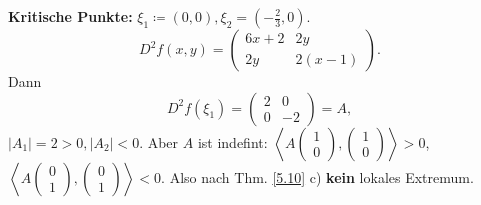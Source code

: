 \textbf{Kritische Punkte:} $ \xi_1 \coloneqq (0, 0), \xi_2 = \left( - \frac{ 2 }{ 3 } , 0 \right)  $.
\[
	D^2 f (x, y) = \begin{pmatrix} 6x + 2 & 2y \\ 2y & 2(x - 1) \end{pmatrix} .
\]
Dann
\[
	D^2f(\xi_1) = \begin{pmatrix} 2 & 0 \\ 0 & -2 \end{pmatrix} = A,
\]
$ \left| A_1 \right| = 2 > 0, \left| A_2 \right| < 0 $.
Aber $ A $ ist indefint:
$ \left< A \begin{pmatrix} 1 \\ 0 \end{pmatrix} , \begin{pmatrix} 1 \\ 0 \end{pmatrix}  \right> > 0$, $ \left< A \begin{pmatrix} 0 \\ 1 \end{pmatrix} , \begin{pmatrix} 0 \\ 1 \end{pmatrix}  \right> <0 $.
Also nach Thm. \ref{5.10} c) \textbf{kein} lokales Extremum.

